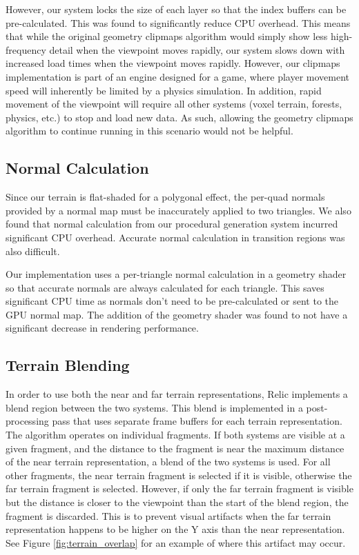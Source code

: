 However, our system locks the size of each layer so that the index buffers can be pre-calculated.
This was found to significantly reduce CPU overhead.
This means that while the original geometry clipmaps algorithm would simply show less high-frequency detail when the viewpoint moves rapidly, our system slows down with increased load times when the viewpoint moves rapidly.
However, our clipmaps implementation is part of an engine designed for a game, where player movement speed will inherently be limited by a physics simulation.
In addition, rapid movement of the viewpoint will require all other systems (voxel terrain, forests, physics, etc.) to stop and load new data.
As such, allowing the geometry clipmaps algorithm to continue running in this scenario would not be helpful.

\subsection{Normal Calculation}

Since our terrain is flat-shaded for a polygonal effect, the per-quad normals provided by a normal map must be inaccurately applied to two triangles.
We also found that normal calculation from our procedural generation system incurred significant CPU overhead.
Accurate normal calculation in transition regions was also difficult.

Our implementation uses a per-triangle normal calculation in a geometry shader so that accurate normals are always calculated for each triangle.
This saves significant CPU time as normals don't need to be pre-calculated or sent to the GPU normal map.
The addition of the geometry shader was found to not have a significant decrease in rendering performance.

\subsection{Terrain Blending}

In order to use both the near and far terrain representations, Relic implements a blend region between the two systems.
This blend is implemented in a post-processing pass that uses separate frame buffers for each terrain representation.
The algorithm operates on individual fragments.
If both systems are visible at a given fragment, and the distance to the fragment is near the maximum distance of the near terrain representation, a blend of the two systems is used.
For all other fragments, the near terrain fragment is selected if it is visible, otherwise the far terrain fragment is selected.
However, if only the far terrain fragment is visible but the distance is closer to the viewpoint than the start of the blend region, the fragment is discarded.
This is to prevent visual artifacts when the far terrain representation happens to be higher on the Y axis than the near representation.
See Figure \ref{fig:terrain_overlap} for an example of where this artifact may occur.

